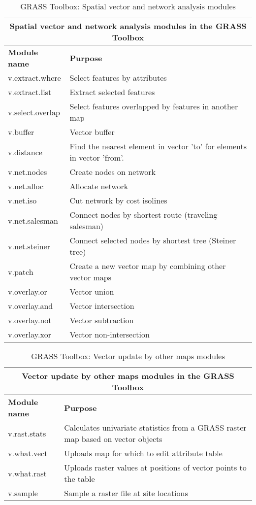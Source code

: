 \begin{table}[ht]
\centering
\caption{GRASS Toolbox: Spatial vector and network analysis modules}\medskip
 \begin{tabular}{|p{4cm}|p{12cm}|}
  \hline \multicolumn{2}{|c|}{\textbf{Spatial vector and network analysis modules in the GRASS
  Toolbox}} \\
  \hline \textbf{Module name} & \textbf{Purpose} \\
  \hline v.extract.where & Select features by attributes \\
  \hline v.extract.list & Extract selected features \\
  \hline v.select.overlap & Select features overlapped by features in another
  map\\
  \hline v.buffer & Vector buffer \\
  \hline v.distance & Find the nearest element in vector 'to' for elements in
  vector 'from'. \\
  \hline v.net.nodes & Create nodes on network \\
  \hline v.net.alloc & Allocate network\\
  \hline v.net.iso & Cut network by cost isolines \\
  \hline v.net.salesman & Connect nodes by shortest route (traveling
  salesman) \\
  \hline v.net.steiner & Connect selected nodes by shortest tree (Steiner
  tree) \\
  \hline v.patch & Create a new vector map by combining other vector maps \\
  \hline v.overlay.or & Vector union \\
  \hline v.overlay.and & Vector intersection \\
  \hline v.overlay.not & Vector subtraction \\
  \hline v.overlay.xor & Vector non-intersection \\
\hline
\end{tabular}
\end{table}

\begin{table}[ht]
\centering
\caption{GRASS Toolbox: Vector update by other maps modules}\medskip
 \begin{tabular}{|p{4cm}|p{12cm}|}
  \hline \multicolumn{2}{|c|}{\textbf{Vector update by other maps modules in the GRASS
  Toolbox}} \\
  \hline \textbf{Module name} & \textbf{Purpose} \\
  \hline v.rast.stats & Calculates univariate statistics from a GRASS raster
  map based on vector objects\\
  \hline v.what.vect & Uploads map for which to edit attribute table \\
  \hline v.what.rast & Uploads raster values at positions of vector points to
  the table \\
  \hline v.sample & Sample a raster file at site locations \\
\hline
\end{tabular}
\end{table}

